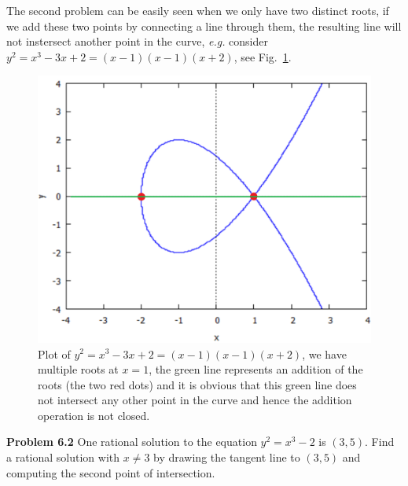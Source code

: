 \documentclass[aps,preprint,preprintnumbers,nofootinbib,showpacs,prd]{revtex4-1}
\newcommand{\eg}{{\it e.g.} }
\begin{document}
The second problem can be easily seen when we only have two distinct roots, if we add these two points by connecting a line through them, the resulting line will not instersect another point in the curve, \eg consider $y^2 = x^3-3x+2 = (x-1)(x-1)(x+2)$, see Fig.~\ref{fig:singular-curve}.
%
\begin{figure}
\centering
  \includegraphics[width=.55\linewidth]{singular_curve.png}
  \caption{Plot of $y^2 = x^3-3x+2 = (x-1)(x-1)(x+2)$, we have multiple roots at $x=1$, the green line represents an addition of the roots (the two red dots) and it is obvious that this green line does not intersect any other point in the curve and hence the addition operation is not closed.}
\label{fig:singular-curve}
\end{figure}
%

{\bf Problem 6.2} One rational solution to the equation $y^2 = x^3 − 2$ is $(3, 5)$. Find a rational solution with $x \neq 3$ by drawing the tangent line to $(3, 5)$ and computing the second point of intersection.
\end{document}
